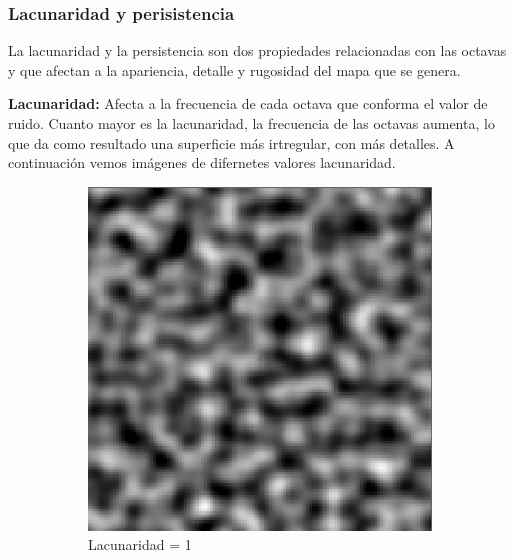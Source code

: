 \subsubsection{Lacunaridad y perisistencia}

La lacunaridad y la persistencia son dos propiedades relacionadas con las octavas y que afectan a la apariencia, detalle y rugosidad del mapa que se genera.

\textbf{Lacunaridad: } Afecta a la frecuencia de cada octava que conforma el valor de ruido. Cuanto mayor es la lacunaridad, la frecuencia de las octavas aumenta, lo que da como resultado una superficie más irtregular, con más detalles. A continuación vemos imágenes de difernetes valores lacunaridad. 
\begin{figure}[ht]
    \begin{subfigure}{0.3\linewidth}
        \centering
        \includegraphics[width=\linewidth]{img/LowLacunarity.png}
        \caption{Lacunaridad = 1 }
    \end{subfigure}
    \hfill
    \begin{subfigure}{0.3\linewidth}
        \centering

\end{subfigure}
\end{figure}
